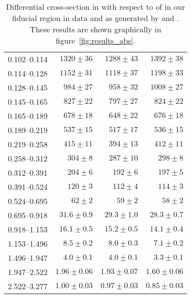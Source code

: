 \begin{table}
\begin{center}
\begin{tabular}{@{}l r r r@{}}
            0.102--0.114  &  $1320  \pm  36$    &  $1288  \pm  43$    &  $1392  \pm  38$    \\
            0.114--0.128  &  $1152  \pm  31$    &  $1118  \pm  37$    &  $1198  \pm  33$    \\
            0.128--0.145  &  $984   \pm  27$    &  $958   \pm  32$    &  $1008  \pm  27$    \\
            0.145--0.165  &  $827   \pm  22$    &  $797   \pm  27$    &  $824   \pm  22$    \\
            0.165--0.189  &  $678   \pm  18$    &  $648   \pm  22$    &  $676   \pm  18$    \\
            0.189--0.219  &  $537   \pm  15$    &  $517   \pm  17$    &  $536   \pm  15$    \\
            0.219--0.258  &  $415   \pm  11$    &  $394   \pm  13$    &  $412   \pm  11$    \\
            0.258--0.312  &  $304   \pm  8$     &  $287   \pm  10$    &  $298   \pm  8$     \\
            0.312--0.391  &  $204   \pm  6$     &  $192   \pm  6$     &  $197   \pm  5$     \\
            0.391--0.524  &  $120   \pm  3$     &  $112   \pm  4$     &  $114   \pm  3$     \\
            0.524--0.695  &  $62    \pm  2$     &  $59    \pm  2$     &  $58    \pm  2$     \\
            0.695--0.918  &  $31.6  \pm  0.9$   &  $29.3  \pm  1.0$   &  $28.3  \pm  0.7$   \\
            0.918--1.153  &  $16.1  \pm  0.5$   &  $15.2  \pm  0.5$   &  $14.1  \pm  0.4$   \\
            1.153--1.496  &  $8.5   \pm  0.2$   &  $8.0   \pm  0.3$   &  $7.1   \pm  0.2$   \\
            1.496--1.947  &  $4.0   \pm  0.1$   &  $4.0   \pm  0.1$   &  $3.3   \pm  0.1$   \\
            1.947--2.522  &  $1.96  \pm  0.06$  &  $1.93  \pm  0.07$  &  $1.60  \pm  0.06$  \\
            2.522--3.277  &  $1.00  \pm  0.03$  &  $0.97  \pm  0.03$  &  $0.85  \pm  0.03$  \\
            \bottomrule
        \end{tabular}
    \end{center}
    \caption[
        Differential cross-section in \pb with respect to \phistar of \Ztoee.
    ]{
        Differential cross-section in \pb with respect to \phistar of \Ztoee in
        our fiducial region in data and as generated by \MADGRAPH and \POWHEG.
        These results are shown graphically in figure~\ref{fig:results_abs}.
    }
    \label{tab:results_abs}
\end{table}
